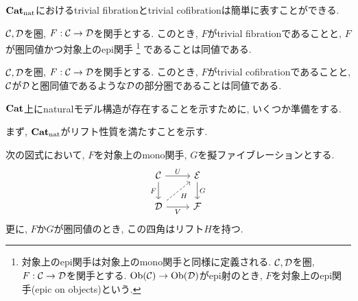 \documentclass[uplatex, a4paper, 14Q, dvipdfmx]{jsarticle}
\begin{document}
$\mathbf{Cat}_\mathrm{nat}$におけるtrivial fibrationとtrivial cofibrationは簡単に表すことができる.

\begin{remark} \label{rem:trifib_is_in_Cat}
  $\mathcal{C},\mathcal{D}$を圏, $F : \mathcal{C} \to \mathcal{D}$を関手とする. 
  このとき, $F$がtrivial fibrationであることと, $F$が圏同値かつ対象上のepi関手
  \footnote{
    対象上のepi関手は対象上のmono関手と同様に定義される. 
    $\mathcal{C},\mathcal{D}$を圏, $F : \mathcal{C} \to \mathcal{D}$を関手とする. 
    $\mathrm{Ob}(\mathcal{C}) \to \mathrm{Ob}(\mathcal{D})$がepi射のとき, $F$を対象上のepi関手(epic on objects)という. 
  }
  であることは同値である.
\end{remark}

\begin{remark} \label{rem:tricof_is_in_Cat}
  $\mathcal{C},\mathcal{D}$を圏, $F : \mathcal{C} \to \mathcal{D}$を関手とする. 
  このとき, $F$がtrivial cofibrationであることと, $\mathcal{C}$が$\mathcal{D}$と圏同値であるような$\mathcal{D}$の部分圏であることは同値である. 
\end{remark}

$\mathbf{Cat}$上にnaturalモデル構造が存在することを示すために, いくつか準備をする.

まず, $\mathbf{Cat}_\mathrm{nat}$がリフト性質を満たすことを示す. 

\begin{lemma} \label{prop:Cat_has_lift}
  次の図式において, $F$を対象上のmono関手, $G$を擬ファイブレーションとする. 
  \[\begin{tikzcd}
    \C & \E \\
    \D & \F
    \arrow["F"', from=1-1, to=2-1]
    \arrow["U", from=1-1, to=1-2]
    \arrow["G", from=1-2, to=2-2]
    \arrow["V"', from=2-1, to=2-2]
    \arrow["H"', dashed, from=2-1, to=1-2]
  \end{tikzcd}\]
  更に, $F$か$G$が圏同値のとき, この四角はリフト$H$を持つ. 
\end{lemma}
\end{document}
